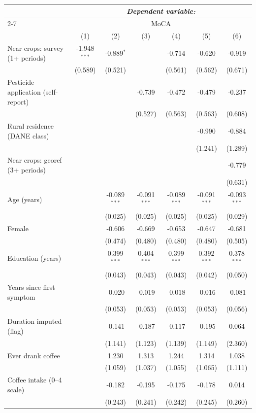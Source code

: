 \begin{tabular}{lcccccc}
\hline\hline
 & \multicolumn{6}{c}{\textit{Dependent variable:}} \\
\cline{2-7}
 & \multicolumn{6}{c}{MoCA} \\
 & (1) & (2) & (3) & (4) & (5) & (6) \\
\hline
Near crops: survey (1+ periods) & -1.948$^{***}$ & -0.889$^{*}$ &  & -0.714 & -0.620 & -0.919 \\
 & (0.589) & (0.521) &  & (0.561) & (0.562) & (0.671) \\
Pesticide application (self-report) &  &  & -0.739 & -0.472 & -0.479 & -0.237 \\
 &  &  & (0.527) & (0.563) & (0.563) & (0.608) \\
Rural residence (DANE class) &  &  &  &  & -0.990 & -0.884 \\
 &  &  &  &  & (1.241) & (1.289) \\
Near crops: georef (3+ periods) &  &  &  &  &  & -0.779 \\
 &  &  &  &  &  & (0.631) \\
Age (years) &  & -0.089$^{***}$ & -0.091$^{***}$ & -0.089$^{***}$ & -0.091$^{***}$ & -0.093$^{***}$ \\
 &  & (0.025) & (0.025) & (0.025) & (0.025) & (0.029) \\
Female &  & -0.606 & -0.669 & -0.653 & -0.647 & -0.681 \\
 &  & (0.474) & (0.480) & (0.480) & (0.480) & (0.505) \\
Education (years) &  & 0.399$^{***}$ & 0.404$^{***}$ & 0.399$^{***}$ & 0.392$^{***}$ & 0.378$^{***}$ \\
 &  & (0.043) & (0.043) & (0.043) & (0.042) & (0.050) \\
Years since first symptom &  & -0.020 & -0.019 & -0.018 & -0.016 & -0.081 \\
 &  & (0.053) & (0.053) & (0.053) & (0.053) & (0.056) \\
Duration imputed (flag) &  & -0.141 & -0.187 & -0.117 & -0.195 & 0.064 \\
 &  & (1.141) & (1.123) & (1.139) & (1.149) & (2.360) \\
Ever drank coffee &  & 1.230 & 1.313 & 1.244 & 1.314 & 1.038 \\
 &  & (1.059) & (1.037) & (1.055) & (1.065) & (1.111) \\
Coffee intake (0--4 scale) &  & -0.182 & -0.195 & -0.175 & -0.178 & 0.014 \\
 &  & (0.243) & (0.241) & (0.242) & (0.245) & (0.260) \\

\end{tabular}
